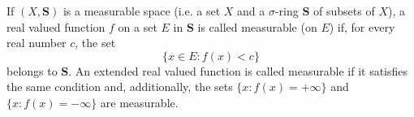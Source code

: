 If $(X, \mathbf{S})$ is a measurable space (i.e. a set $X$ and a $\sigma$-ring $\mathbf{S}$ of subsets of $X$), a real valued function $f$ on a set $E$ in $\mathbf{S}$ is called measurable (on $E$) if, for every real number $c$, the set
$$\{x \in E: f(x) < c\}$$
belongs to $\mathbf{S}$. An extended real valued function is called measurable if it satisfies the same condition and, additionally, the sets $\{x: f(x) = +\infty\}$ and $\{x: f(x) = -\infty\}$ are measurable.
